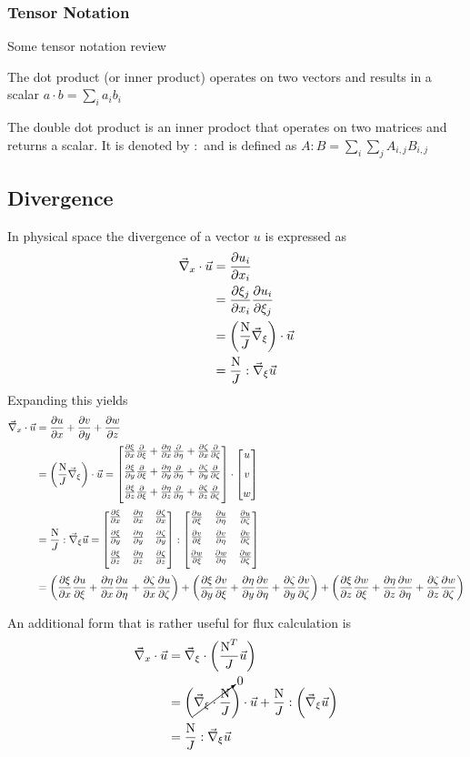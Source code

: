 \subsubsection{Tensor Notation}
  Some tensor notation review

  The dot product (or inner product) operates on two vectors and results in a scalar $a \cdot b = \sum_i a_i b_i$
  
  The double dot product is an inner prodoct that operates on two matrices and returns a scalar. It is denoted by $:$ and is defined as $A:B = \sum_i \sum_j A_{i,j} B_{i,j}$


\subsection{Divergence}
In physical space the divergence of a vector $u$ is expressed as
\begin{align*}
  \vecnabla_x \cdot \vec{u} 
  &= \fpartial{u_i}{x_i}{1} \\
  &= \fpartial{\xi_j}{x_i}{1} \fpartial{u_i}{\xi_j}{1} \\
  &= \bigg(\NJ \vecnabla_{\xi} \bigg) \cdot \vec{u} \\
  &= \NJ : \vecnabla_{\xi} \vec{u}
\end{align*}
Expanding this yields
\begin{align*}
  \vecnabla_x \cdot \vec{u}
  &= \fpartial{u}{x}{1} + \fpartial{v}{y}{1} + \fpartial{w}{z}{1} \\
  &= \bigg(\NJ \vecnabla_{\xi} \bigg) \cdot \vec{u}
    = \nablaXmapped \cdot \Uvec \\
  &= \NJ : \vecnabla_{\xi} \vec{u}
    = \metricT :  \gradXiMat{u}{v}{w}\\
  &= \bigg( \fpartial{\xi}{x}{1} \fpartial{u}{\xi}{1} + \fpartial{\eta}{x}{1} \fpartial{u}{\eta}{1} + \fpartial{\zeta}{x}{1} \fpartial{u}{\zeta}{1} \bigg) +
    \bigg( \fpartial{\xi}{y}{1} \fpartial{v}{\xi}{1} + \fpartial{\eta}{y}{1} \fpartial{v}{\eta}{1} + \fpartial{\zeta}{y}{1} \fpartial{v}{\zeta}{1} \bigg) +
    \bigg( \fpartial{\xi}{z}{1} \fpartial{w}{\xi}{1} + \fpartial{\eta}{z}{1} \fpartial{w}{\eta}{1} + \fpartial{\zeta}{z}{1} \fpartial{w}{\zeta}{1} \bigg)
\end{align*}

An additional form that is rather useful for flux calculation is
\begin{align*}
  {\vec{\nabla}}_x \cdot \vec{u} 
  &= {\vec{\nabla}}_{\xi} \cdot \bigg(\frac{{{\text{N}}^T}}{J} \vec{u} \bigg) \\
  &= \bigg( \cancelto{0}{ {\vec{\nabla}}_{\xi} \cdot \frac{{{\text{N}}}}{J} } \bigg) \cdot \vec{u} + \frac{{{\text{N}}}}{J} : \bigg( {\vec{\nabla}}_{\xi} \vec{u} \bigg) \\
  &= \frac{{{\text{N}}}}{J} : {\vec{\nabla}}_{\xi} \vec{u}
\end{align*}

